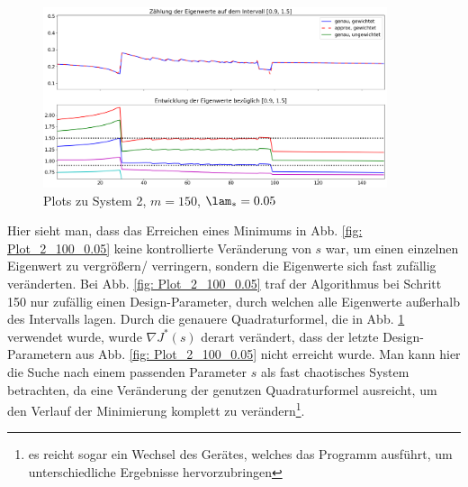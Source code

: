 \documentclass[a4paper,12pt]{report}
\newcommand{\1}{\mathds{1}}
\theoremstyle{plain} %
\theoremstyle{definition} %
\theoremstyle{remark}
\begin{document}
            \begin{figure}[ht]
                  \centering
                  \includegraphics[width=0.9\textwidth, keepaspectratio]{./Original/Plot_2_150_0.05.png}
                  \caption{Plots zu System 2, $m=150$, $\lam_*=0.05$}
                  \label{fig: Plot_2_150_0.05}
            \end{figure}

            Hier sieht man, dass das Erreichen eines Minimums in Abb. \ref{fig: Plot_2_100_0.05} keine kontrollierte Veränderung von $s$ war, um einen einzelnen Eigenwert zu vergrößern/ verringern, sondern die Eigenwerte sich fast zufällig veränderten.
            Bei Abb. \ref{fig: Plot_2_100_0.05} traf der Algorithmus bei Schritt 150 nur zufällig einen Design-Parameter, durch welchen alle Eigenwerte außerhalb des Intervalls lagen.
            Durch die genauere Quadraturformel, die in Abb. \ref{fig: Plot_2_150_0.05} verwendet wurde, wurde $\nabla J^*(s)$ derart verändert, dass der letzte Design-Parametern aus Abb. \ref{fig: Plot_2_100_0.05} nicht erreicht wurde.
            Man kann hier die Suche nach einem passenden Parameter $s$ als fast chaotisches System betrachten, da eine Veränderung der genutzen Quadraturformel ausreicht, um den Verlauf der Minimierung komplett zu verändern\footnote{es reicht sogar ein Wechsel des Gerätes, welches das Programm ausführt, um unterschiedliche Ergebnisse hervorzubringen}.
\end{document}
